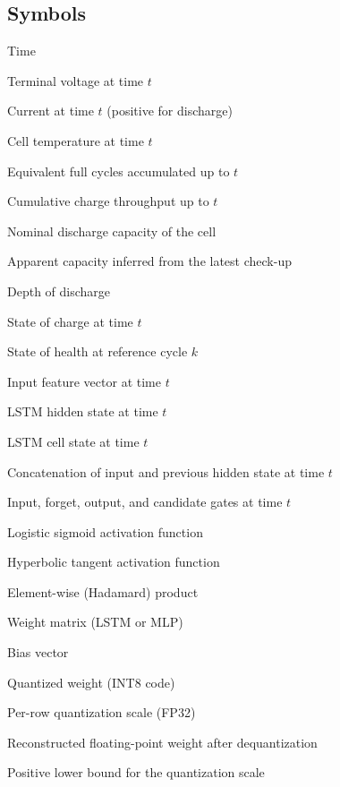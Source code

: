 \documentclass[review]{elsarticle}
\begin{document}
\subsection*{Symbols}
\begin{description}[style=multiline,leftmargin=1.5cm,font=\bfseries]
\item[$t$] Time
\item[$U(t)$] Terminal voltage at time $t$
\item[$I(t)$] Current at time $t$ (positive for discharge)
\item[$T(t)$] Cell temperature at time $t$
\item[$\mathrm{EFC}(t)$] Equivalent full cycles accumulated up to $t$
\item[$Q_c(t)$] Cumulative charge throughput up to $t$
\item[$C_{\mathrm{nom}}$] Nominal discharge capacity of the cell
\item[$C_{\mathrm{app}}$] Apparent capacity inferred from the latest check-up
\item[$\mathrm{DoD}$] Depth of discharge
\item[$\mathrm{SOC}(t)$] State of charge at time $t$
\item[$\mathrm{SOH}_k$] State of health at reference cycle $k$
\item[$\mathbf{x}_t$] Input feature vector at time $t$
\item[$\mathbf{h}_t$] LSTM hidden state at time $t$
\item[$\mathbf{c}_t$] LSTM cell state at time $t$
\item[$\mathbf{z}_t$] Concatenation of input and previous hidden state at time $t$
\item[$\mathbf{i}_t,\mathbf{f}_t,\mathbf{o}_t,\mathbf{g}_t$] Input, forget, output, and candidate gates at time $t$
\item[$\sigma(\cdot)$] Logistic sigmoid activation function
\item[$\tanh(\cdot)$] Hyperbolic tangent activation function
\item[$\odot$] Element-wise (Hadamard) product
\item[$W$] Weight matrix (LSTM or MLP)
\item[$b$] Bias vector
\item[$q$] Quantized weight (INT8 code)
\item[$s$] Per-row quantization scale (FP32)
\item[$\hat{w}$] Reconstructed floating-point weight after dequantization
\item[$\varepsilon_q$] Positive lower bound for the quantization scale

\end{description}
\end{document}
